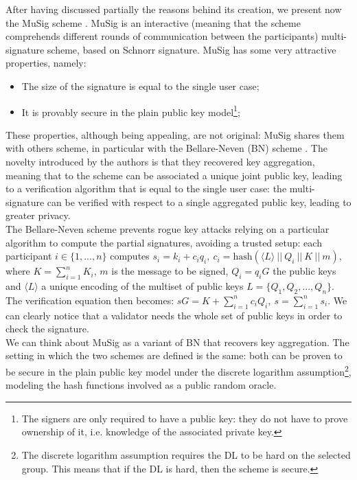 \bigskip
\noindent
After having discussed partially the reasons behind its creation, we present now the MuSig scheme \cite{RefWork:11}. MuSig is an interactive (meaning that the scheme comprehends different rounds of communication between the participants) multi-signature scheme, based on Schnorr signature. MuSig has some very attractive properties, namely:
\begin{itemize}
	\item The size of the signature is equal to the single user case;
	\item It is provably secure in the plain public key model\footnote{The signers are only required to have a public key: they do not have to prove ownership of it, i.e. knowledge of the associated private key.};
\end{itemize}
These properties, although being appealing, are not original: MuSig shares them with others scheme, in particular with the Bellare-Neven (BN) scheme \cite{RefWork:10}. The novelty introduced by the authors is that they recovered key aggregation, meaning that to the scheme can be associated a unique joint public key, leading to a verification algorithm that is equal to the single user case: the multi-signature can be verified with respect to a single aggregated public key, leading to greater privacy. 
\\
The Bellare-Neven scheme prevents rogue key attacks relying on a particular algorithm to compute the partial signatures, avoiding a trusted setup: each participant $i \in \{1, ..., n\}$ computes $s_i = k_i + c_iq_i, \ c_i = \text{hash}(\langle L \rangle\ || \ Q_i \ || \ K \ || \ m)$, where $K = \sum_{i = 1}^{n}K_i$, $m$ is the message to be signed, $Q_i = q_iG$ the public keys and $\langle L \rangle$ a unique encoding of the multiset of public keys $L = \{Q_1, Q_2, ..., Q_n\}$. The verification equation then becomes: $sG = K + \sum_{i = 1}^{n}c_iQ_i, \ s = \sum_{i = 1}^{n}s_i$. We can clearly notice that a validator needs the whole set of public keys in order to check the signature. 
\\
We can think about MuSig as a variant of BN that recovers key aggregation. The setting in which the two schemes are defined is the same: both can be proven to be secure in the plain public key model under the discrete logarithm assumption\footnote{The discrete logarithm assumption requires the DL to be hard on the selected group. This means that if the DL is hard, then the scheme is secure.}, modeling the hash functions involved as a public random oracle.
\\
